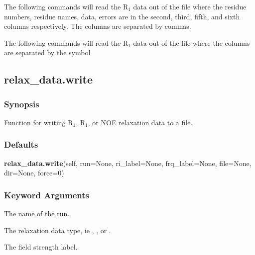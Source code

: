 The following commands will read  the R$_1$ data out of the file 
 where the residue
numbers, residue names, data, errors are in the second, third, fifth, and sixth columns
respectively.  The columns are separated by commas.





The following commands will read  the R$_1$ data out of the file 
 where the columns are
separated by the symbol 




\newpage

\subsection{relax\_data.write}


\subsubsection{Synopsis}

Function for writing R$_1$, R$_1$, or NOE relaxation data to a file.

\subsubsection{Defaults}

\textsf{\textbf{relax\_data.write}(self, run=None, ri\_label=None, frq\_label=None, file=None, dir=None, force=0)}


\subsubsection{Keyword Arguments}


  The name of the run.

  The relaxation  data type, ie 
, 
, or 
.

  The field strength label.

